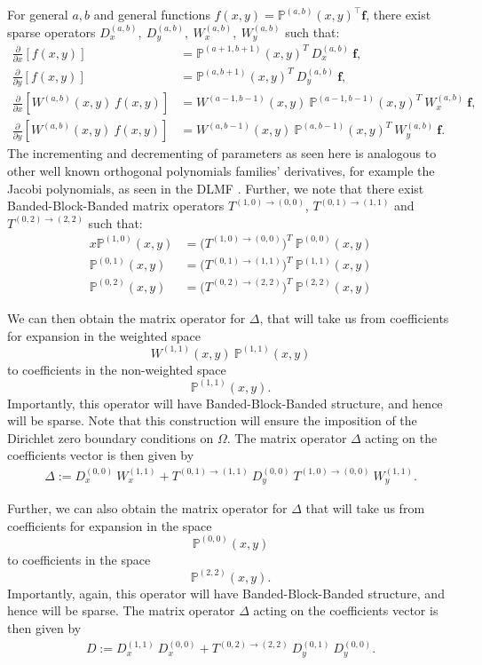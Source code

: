 \documentclass[11pt, oneside]{article}   	%
\newcommand{\bigP}{\mathbb{P}}
\newcommand{\Wab}{{W^{(a,b)}}}
\newcommand{\bigPab}{\bigP^{(a,b)}}
\newcommand{\Wii}{W^{(1,1)}}
\newcommand{\bigPii}{{\mathbb{P}^{(1,1)}}}
\newcommand{\bigPoo}{{\mathbb{P}^{(0,0)}}}
\newcommand{\dx}{\frac{\partial}{\partial x}}
\newcommand{\dy}{\frac{\partial}{\partial y}}
\begin{document}
For general \(a,b\) and general functions \(f(x,y) = \bigPab(x,y)^\top \mathbf{f}\), there exist sparse operators \(D_x^{(a,b)}, \: D_y^{(a,b)}, \: W_x^{(a,b)}, \: W_y^{(a,b)}\) such that:
\begin{align}
\dx[f(x,y)] &= \bigP^{(a+1,b+1)}(x,y)^T \: D_x^{(a,b)} \: \mathbf{f}, \\
\dy[f(x,y)] &= \bigP^{(a,b+1)}(x,y)^T \: D_y^{(a,b)} \: \mathbf{f}, \\
\dx[\Wab(x,y) \: f(x,y)] &= W^{(a-1,b-1)}(x,y) \: \bigP^{(a-1,b-1)}(x,y)^T \: W_x^{(a,b)} \: \mathbf{f}, \\
\dy[\Wab(x,y) \: f(x,y)] &= W^{(a,b-1)}(x,y) \: \bigP^{(a,b-1)}(x,y)^T \: W_y^{(a,b)} \: \mathbf{f}.
\end{align}
The incrementing and decrementing of parameters as seen here is analogous to other well known orthogonal polynomials families' derivatives, for example the Jacobi polynomials, as seen in the DLMF \cite{DLMFDerivatives}.
Further, we note that there exist Banded-Block-Banded matrix operators \(T^{(1,0)\to(0,0)}\), \(T^{(0,1)\to(1,1)}\) and $T^{(0,2)\to(2,2)}$ such that:
\begin{align}
x \bigP^{(1,0)}(x,y) &= \Big(T^{(1,0)\to(0,0)} \Big)^T \: \bigP^{(0,0)}(x,y) \\
\bigP^{(0,1)}(x,y) &= \Big(T^{(0,1)\to(1,1)} \Big)^T \: \bigP^{(1,1)}(x,y) \\
\bigP^{(0,2)}(x,y) &= \Big(T^{(0,2)\to(2,2)} \Big)^T \: \bigP^{(2,2)}(x,y)
\end{align}

We can then obtain the matrix operator for \(\Delta\), that will take us from coefficients for expansion in the weighted space
\[
\Wii(x,y) \: \bigPii(x,y)
\]
to coefficients in the non-weighted space
\[
\bigPii(x,y).
\]
Importantly, this operator will have Banded-Block-Banded structure, and hence will be sparse. Note that this construction will ensure the imposition of the Dirichlet zero boundary conditions on $\Omega$. The matrix operator \(\Delta\) acting on the coefficients vector is then given by
\begin{align}
    \Delta := D_x^{(0,0)} \: W_x^{(1,1)} + T^{(0,1)\to(1,1)} \: D_y^{(0,0)} \: T^{(1,0)\to(0,0)} \: W_y^{(1,1)}.
\end{align}

Further, we can also obtain the matrix operator for \(\Delta\) that will take us from coefficients for expansion in the space
\[
\bigPoo(x,y)
\]
to coefficients in the space
\[
\bigP^{(2,2)}(x,y).
\]
Importantly, again, this operator will have Banded-Block-Banded structure, and hence will be sparse. The matrix operator \(\Delta\) acting on the coefficients vector is then given by
\begin{align}
    D := D_x^{(1,1)} \: D_x^{(0,0)} + T^{(0,2)\to(2,2)} \: D_y^{(0,1)} \: D_y^{(0,0)}.
\end{align}
\end{document}
